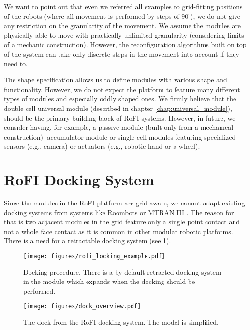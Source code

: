 We want to point out that even we referred all examples to grid-fitting
positions of the robots (where all movement is performed by steps of
$90^\circ$), we do not give any restriction on the granularity of the movement.
We assume the modules are physically able to move with practically
unlimited granularity (considering limits of a mechanic construction). However,
the reconfiguration algorithms built on top of the system can take only
discrete steps in the movement into account if they need to.

The shape specification allows us to define modules with various shape and
functionality. However, we do not expect the platform to feature many different
types of modules and especially oddly shaped ones. We firmly believe that the
double cell universal module (described in chapter \ref{chap:universal_module}),
should be the primary building block of RoFI systems. However, in future, we
consider having, for example, a passive module (built only from a mechanical
construction), accumulator module or single-cell modules featuring specialized
sensors (e.g., camera) or actuators (e.g., robotic hand or a wheel).

\section{RoFI Docking System}\label{sec:dock}

Since the modules in the RoFI platform are grid-aware, we cannot adapt existing
docking systems from systems like Roombots \cite{bonardi_locomotion_2012} or
MTRAN III \cite{kurokawa_distributed_2008}. The reason for that is two adjacent
modules in the grid feature only a single point contact and not a whole face
contact as it is common in other modular robotic platforms. There is a need for
a retractable docking system (see \ref{fig:rofi_locking_example}).

\begin{figure}[t]
    \centering
    \texttt{[image: figures/rofi\_locking\_example.pdf]}
    \caption{Docking procedure. There is a by-default retracted docking system
    in the module which expands when the docking should be performed.}
    \label{fig:rofi_locking_example}
\end{figure}


\begin{figure}[t]
    \centering
    \texttt{[image: figures/dock\_overview.pdf]}
    \caption{The dock from the RoFI docking system. The model is simplified.}
    \label{fig:dock_overview}
\end{figure}

